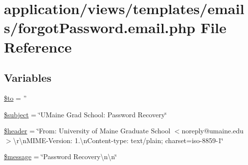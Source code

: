 \hypertarget{forgot_password_8email_8php}{\section{application/views/templates/emails/forgot\-Password.email.\-php File Reference}
\label{forgot_password_8email_8php}
}
\subsection*{Variables}
\begin{DoxyCompactItemize}
\item 
\hyperlink{forgot_password_8email_8php_ac19f839b525d6d99d063fe56bf2a6d3b}{\$to} = ''
\item 
\hyperlink{forgot_password_8email_8php_afea90503726cd5ad2eb80baf0b6d217d}{\$subject} = \char`\"{}U\-Maine Grad School\-: Password Recovery\char`\"{}
\item 
\hyperlink{forgot_password_8email_8php_a4f44601f2b9dc8a1644bce53c94ce622}{\$header} = \char`\"{}From\-: University of Maine Graduate School $<$noreply@umaine.\-edu$>$\textbackslash{}r\textbackslash{}n\-M\-I\-M\-E-\/Version\-: 1.\textbackslash{}n\-Content-\/type\-: text/plain; charset=iso-\/8859-\/1\char`\"{}
\item 
\hyperlink{forgot_password_8email_8php_abf17cb2dba2ed17cb28aa5f37deb5293}{\$message} = \char`\"{}Password Recovery\textbackslash{}n\textbackslash{}n\char`\"{}
\end{DoxyCompactItemize}


